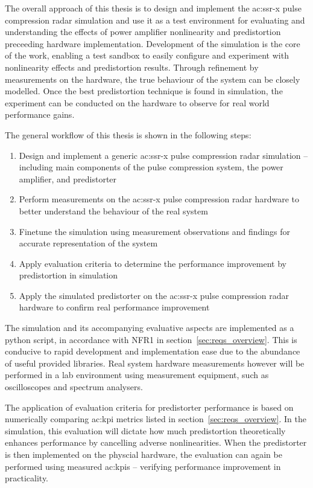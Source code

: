 The overall approach of this thesis is to design and implement the \gls{ac:ssr-x} pulse compression radar simulation and use it as a test environment for evaluating and understanding the effects of power amplifier nonlinearity and predistortion preceeding hardware implementation. Development of the simulation is the core of the work, enabling a test sandbox to easily configure and experiment with nonlinearity effects and predistortion results. Through refinement by measurements on the hardware, the true behaviour of the system can be closely modelled. Once the best predistortion technique is found in simulation, the experiment can be conducted on the hardware to observe for real world performance gains. 

The general workflow of this thesis is shown in the following steps:

\begin{enumerate}
  \item Design and implement a generic \gls{ac:ssr-x} pulse compression radar simulation -- including main components of the pulse compression system, the power amplifier, and predistorter
  \item Perform measurements on the \gls{ac:ssr-x} pulse compression radar hardware to better understand the behaviour of the real system
  \item Finetune the simulation using measurement observations and findings for accurate representation of the system
  \item Apply evaluation criteria to determine the performance improvement by predistortion in simulation
  \item Apply the simulated predistorter on the \gls{ac:ssr-x} pulse compression radar hardware to confirm real performance improvement
\end{enumerate}

The simulation and its accompanying evaluative aspects are implemented as a python script, in accordance with NFR1 in section~\ref{sec:reqs_overview}. This is conducive to rapid development and implementation ease due to the abundance of useful provided libraries. Real system hardware measurements however will be performed in a lab environment using measurement equipment, such as oscilloscopes and spectrum analysers.   

The application of evaluation criteria for predistorter performance is based on numerically comparing \gls{ac:kpi} metrics listed in section~\ref{sec:reqs_overview}. In the simulation, this evaluation will dictate how much predistortion theoretically enhances performance by cancelling adverse nonlinearities. When the predistorter is then implemented on the physcial hardware, the evaluation can again be performed using measured \glspl{ac:kpi} -- verifying performance improvement in practicality.

